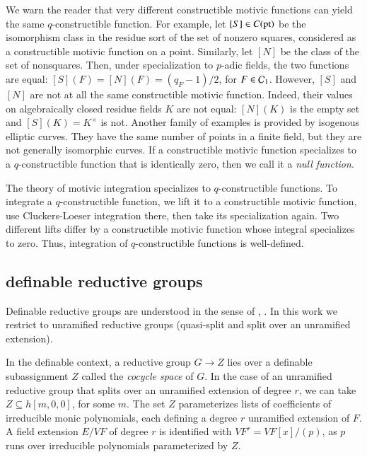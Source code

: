We warn the reader that very different constructible motivic functions
can yield the same $q$-constructible function.  For example, let
$[S]\in C({\operatorname{pt}})$ be the isomorphism class in the residue sort of
the set of nonzero squares, considered as a constructible motivic
function on a point.  Similarly, let $[N]$ be the class of the set of
nonsquares.  Then, under specialization to $p$-adic fields, the two
functions are equal: $[S](F) = [N](F) = (q_F-1)/2$, for
$F\in\mathcal C_1$. However, $[S]$ and $[N]$ are not at all the same
constructible motivic function. Indeed, their values on algebraically
closed residue fields $K$ are not equal: $[N](K)$ is the empty set and
$[S](K) = K^\times$ is not.  Another family of examples is provided by
isogenous elliptic curves.  They have the same number of points in a
finite field, but they are not generally isomorphic curves.  If a
constructible motivic function specializes to a $q$-constructible
function that is identically zero, then we call it a {\it null function}.

The theory of motivic integration specializes to $q$-constructible
functions. To integrate a $q$-constructible function, we lift it
to a constructible motivic function, use Cluckers-Loeser integration
there, then take its specialization again.  Two different lifts differ
by a constructible motivic function whose integral specializes to
zero. Thus, integration of $q$-constructible functions is well-defined.

\subsection{definable reductive groups}\label{sec:defred}

Definable reductive groups are understood in the sense of
\cite{cluckers2011transfer}, \cite{gordon}.  In this work we restrict
to unramified reductive groups (quasi-split and split over an
unramified extension).

In the definable context, a reductive group $G\to Z$ lies over a
definable subassignment $Z$ called the {\it cocycle space} of $G$.  In
the case of an unramified reductive group that splits over an
unramified extension of degree $r$, we can take $Z\subseteq h[m,0,0]$,
for some $m$.  The set $Z$ parameterizes lists of coefficients of
irreducible monic polynomials, each defining a degree $r$ unramified
extension of $F$.  A field extension $E/VF$ of degree $r$ is
identified with $VF^r = VF[x]/(p)$, as $p$ runs over irreducible
polynomials parameterized by $Z$.

